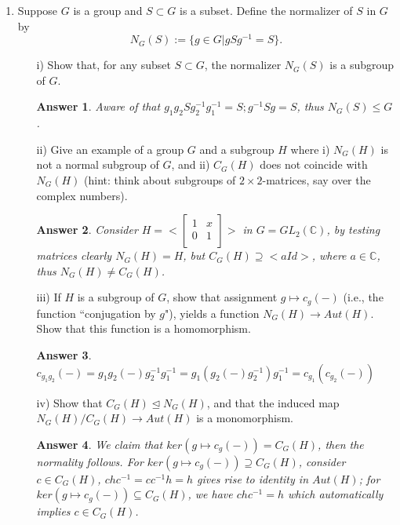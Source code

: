\documentclass[11pt,leqno]{article}
\newcommand{\<}[1]{{\langle}#1 {\rangle}}
\theoremstyle{plain}
\newtheorem*{answer*}{Answer}
\theoremstyle{definition}
\theoremstyle{remark}
\numberwithin{equation}{section}
\begin{document}
\begin{enumerate}
\item Suppose $G$ is a group and $S \subset G$ is a subset.  Define the normalizer of $S$ in $G$ by
    \[
    N_G(S) := \{ g \in G | gSg^{-1} = S \}.
    \]
    \begin{itemize}
    \item[i)]  Show that, for any subset $S \subset G$, the normalizer $N_G(S)$ is a subgroup of $G$.
        \begin{answer*}
        Aware of that $g_1g_2Sg_2^{-1}g_1^{-1}=S; g^{-1}Sg=S$, thus $N_G(S) \leq G$.  
        \end{answer*}
    \item[ii)] Give an example of a group $G$ and a subgroup $H$ where i) $N_G(H)$ is not a normal subgroup of $G$, and ii) $C_G(H)$ does not coincide with $N_G(H)$ (hint: think about subgroups of $2 \times 2$-matrices, say over the complex numbers).
        \begin{answer*}
         Consider $H=  <\begin{bmatrix}
                            1 & x \\
                            0 & 1 \\
                        \end{bmatrix}>$ in $G=GL_2( \mathbb{C})$, by testing matrices clearly $N_G(H)={H}$, but $C_G(H)\supseteq<{aId}>$, where $a\in \mathbb{C}$, thus $N_G(H)\neq C_G(H)$. 
        \end{answer*}
    \item[iii)] If $H$ is a subgroup of $G$, show that assignment $g \mapsto c_g(-)$ (i.e., the function ``conjugation by $g$"), yields a function $N_G(H) \to Aut(H)$.  Show that this function is a homomorphism.
        \begin{answer*}
        $c_{g_1g_2}(-) = g_1g_2(-)g_2^{-1}g_1^{-1} = g_1(g_2(-)g_2^{-1})g_1^{-1} = c_{g_1}(c_{g_2}(-))$
        \end{answer*}
    \item[iv)] Show that $C_G(H) \trianglelefteq N_G(H)$, and that the induced map $N_G(H)/C_G(H) \to Aut(H)$ is a monomorphism.
        \begin{answer*}
        We claim that $ker(g \mapsto c_g(-))=C_G(H)$, then the normality follows. For $ker(g \mapsto c_g(-)) \supseteq C_G(H)$, consider $c \in C_G(H)$, $chc^{-1}=cc^{-1}h=h $ gives rise to identity in $Aut(H)$; for $ker(g \mapsto c_g(-)) \subseteq C_G(H)$, we have $chc^{-1}=h$ which automatically implies $c \in C_G(H)$. 
        

\end{answer*}
\end{itemize}
\end{enumerate}
\end{document}
